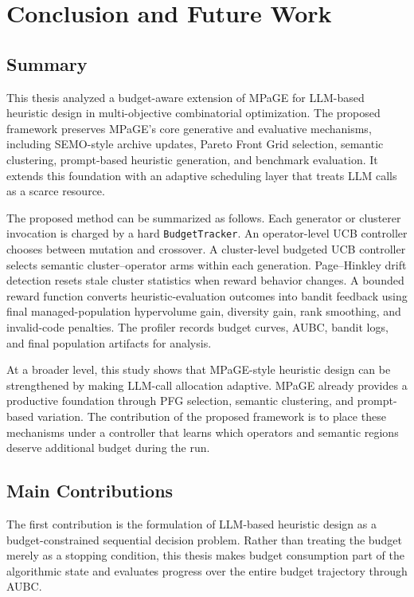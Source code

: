 \chapter{Conclusion and Future Work}

\section{Summary}

This thesis analyzed a budget-aware extension of MPaGE for LLM-based heuristic design in multi-objective combinatorial optimization. The proposed framework preserves MPaGE's core generative and evaluative mechanisms, including SEMO-style archive updates, Pareto Front Grid selection, semantic clustering, prompt-based heuristic generation, and benchmark evaluation. It extends this foundation with an adaptive scheduling layer that treats LLM calls as a scarce resource.

The proposed \bmab{} method can be summarized as follows. Each generator or clusterer invocation is charged by a hard \texttt{BudgetTracker}. An operator-level UCB controller chooses between mutation and crossover. A cluster-level budgeted UCB controller selects semantic cluster--operator arms within each generation. Page--Hinkley drift detection resets stale cluster statistics when reward behavior changes. A bounded reward function converts heuristic-evaluation outcomes into bandit feedback using final managed-population hypervolume gain, diversity gain, rank smoothing, and invalid-code penalties. The profiler records budget curves, AUBC, bandit logs, and final population artifacts for analysis.

At a broader level, this study shows that MPaGE-style heuristic design can be strengthened by making LLM-call allocation adaptive. MPaGE already provides a productive foundation through PFG selection, semantic clustering, and prompt-based variation. The contribution of the proposed framework is to place these mechanisms under a controller that learns which operators and semantic regions deserve additional budget during the run.

\section{Main Contributions}

The first contribution is the formulation of LLM-based heuristic design as a budget-constrained sequential decision problem. Rather than treating the budget merely as a stopping condition, this thesis makes budget consumption part of the algorithmic state and evaluates progress over the entire budget trajectory through AUBC.

